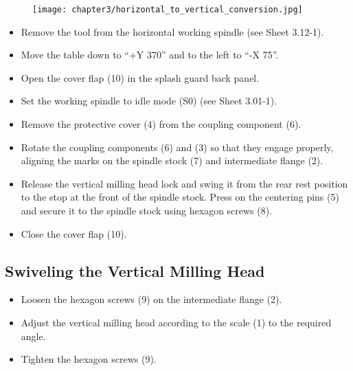 \vspace{0.3cm}


\setcounter{section}{7}

\begin{figure}[h]
    \centering
    \texttt{[image: chapter3/horizontal\_to\_vertical\_conversion.jpg]}
    \label{fig:horizontal_to_vertical_conversion}
\end{figure}

\vspace{0.3cm}

\begin{itemize}
    \item Remove the tool from the horizontal working spindle (see Sheet 3.12-1).
    \item Move the table down to \enquote{+Y 370} and to the left to \enquote{-X 75}.\footnotemark
    \item Open the cover flap (10) in the splash guard back panel.
    \item Set the working spindle to idle mode (S0) (see Sheet 3.01-1).
    \item Remove the protective cover (4) from the coupling component (6).
    \item Rotate the coupling components (6) and (3) so that they engage properly, aligning the marks on the spindle stock (7) and intermediate flange (2).
    \item Release the vertical milling head lock and swing it from the rear rest position to the stop at the front of the spindle stock. Press on the centering pins (5) and secure it to the spindle stock using hexagon screws (8).
    \item Close the cover flap (10).
\end{itemize}

\vspace{0.3cm}

\subsection{Swiveling the Vertical Milling Head}

\begin{itemize}
    \item Loosen the hexagon screws (9) on the intermediate flange (2).
    \item Adjust the vertical milling head according to the scale (1) to the required angle.
    \item Tighten the hexagon screws (9).
\end{itemize}

